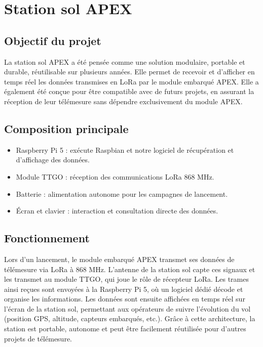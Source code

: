 \documentclass{article}
\begin{document}
\newpage

\section{Station sol APEX}

\subsection{Objectif du projet}

La station sol APEX a été pensée comme une solution modulaire, portable et durable,
réutilisable sur plusieurs années. Elle permet de recevoir et d'afficher en temps réel
les données transmises en LoRa par le module embarqué APEX. Elle a également été conçue
pour être compatible avec de futurs projets, en assurant la réception de leur télémesure
sans dépendre exclusivement du module APEX.

\subsection{Composition principale}

\begin{itemize}
    \item Raspberry Pi 5 : exécute Raspbian et notre logiciel de récupération et
    d'affichage des données.
    \item Module TTGO : réception des communications LoRa 868 MHz.
    \item Batterie : alimentation autonome pour les campagnes de lancement.
    \item Écran et clavier : interaction et consultation directe des données.
\end{itemize}

\subsection{Fonctionnement}

Lors d'un lancement, le module embarqué APEX transmet ses données de télémesure via LoRa à
868 MHz. L'antenne de la station sol capte ces signaux et les transmet au module TTGO, qui
joue le rôle de récepteur LoRa. Les trames ainsi reçues sont envoyées à la Raspberry Pi 5,
où un logiciel dédié décode et organise les informations. Les données sont ensuite affichées
en temps réel sur l'écran de la station sol, permettant aux opérateurs de suivre l'évolution
du vol (position GPS, altitude, capteurs embarqués, etc.). Grâce à cette architecture, la
station est portable, autonome et peut être facilement réutilisée pour d'autres projets de
télémesure.
\end{document}
